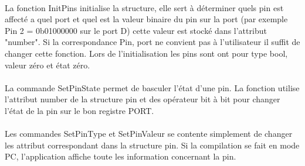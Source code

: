 \paragraph{}
La fonction InitPins initialise la structure, elle sert à déterminer quels pin est affecté a quel port et quel est la valeur binaire du pin sur la port (par exemple Pin 2 = 0b01000000 sur le port D) cette valeur est stocké dans l'attribut "number". Si la correspondance Pin, port ne convient pas à l'utilisateur il suffit de changer cette fonction. Lors de l'initialisation les pins sont ont pour type bool, valeur zéro et état zéro.

\paragraph{}
La commande SetPinState permet de basculer l'état d'une pin. La fonction utilise l'attribut number de la structure pin et des opérateur bit à bit pour changer l'état de la pin sur le bon registre PORT.

\paragraph{}
Les commandes SetPinType et SetPinValeur se contente simplement de changer les attribut correspondant dans la structure pin. Si la compilation se fait en mode PC, l'application affiche toute les information concernant la pin.
